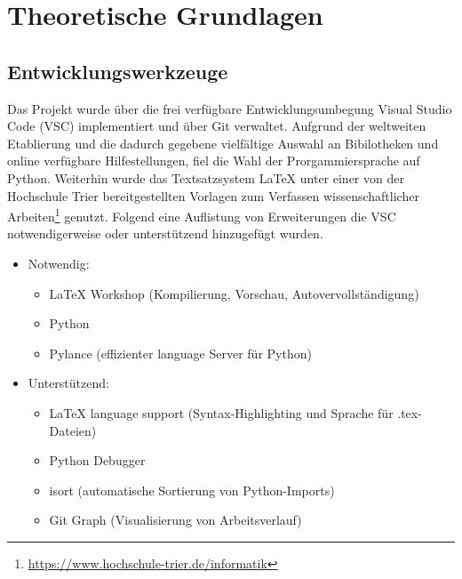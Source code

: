 \chapter{Theoretische Grundlagen}

\section{Entwicklungswerkzeuge}
Das Projekt wurde über die frei verfügbare Entwicklungsumbegung Visual Studio Code (VSC) implementiert und über Git verwaltet. Aufgrund der weltweiten Etablierung und die dadurch gegebene vielfältige Auswahl an Bibilotheken und online verfügbare Hilfestellungen, fiel die Wahl der Prorgammiersprache auf Python. Weiterhin wurde das Textsatzsystem LaTeX unter einer von der Hochschule Trier bereitgestellten Vorlagen zum Verfassen wissenschaftlicher Arbeiten\footnote{\url{https://www.hochschule-trier.de/informatik}} genutzt. Folgend eine Auflistung von Erweiterungen die VSC notwendigerweise oder unterstützend hinzugefügt wurden.
\begin{itemize}
    \item Notwendig:
        \begin{itemize}
            \item LaTeX Workshop (Kompilierung, Vorschau, Autovervollständigung)
            \item Python
            \item Pylance (effizienter language Server für Python)
        \end{itemize}
    \item Unterstützend:
        \begin{itemize}
            \item LaTeX language support (Syntax-Highlighting und Sprache für .tex-Dateien)
            \item Python Debugger
            \item isort (automatische Sortierung von Python-Imports)
            \item Git Graph (Visualisierung von Arbeitsverlauf)
        \end{itemize}
\end{itemize}

